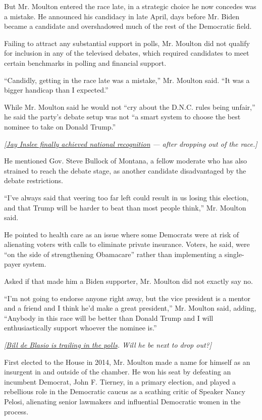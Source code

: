 But Mr. Moulton entered the race late, in a strategic choice he now
concedes was a mistake. He announced his candidacy in late April, days
before Mr. Biden became a candidate and overshadowed much of the rest of
the Democratic field.

Failing to attract any substantial support in polls, Mr. Moulton did not
qualify for inclusion in any of the televised debates, which required
candidates to meet certain benchmarks in polling and financial support.

``Candidly, getting in the race late was a mistake,'' Mr. Moulton said.
``It was a bigger handicap than I expected.''

While Mr. Moulton said he would not ``cry about the D.N.C. rules being
unfair,'' he said the party's debate setup was not ``a smart system to
choose the best nominee to take on Donald Trump.''

\emph{{[}}\href{https://www.nytimes3xbfgragh.onion/2019/08/23/us/politics/jay-inslee.html}{\emph{Jay
Inslee finally achieved national recognition}} \emph{--- after dropping
out of the race.{]}}

He mentioned Gov. Steve Bullock of Montana, a fellow moderate who has
also strained to reach the debate stage, as another candidate
disadvantaged by the debate restrictions.

``I've always said that veering too far left could result in us losing
this election, and that Trump will be harder to beat than most people
think,'' Mr. Moulton said.

He pointed to health care as an issue where some Democrats were at risk
of alienating voters with calls to eliminate private insurance. Voters,
he said, were ``on the side of strengthening Obamacare'' rather than
implementing a single-payer system.

Asked if that made him a Biden supporter, Mr. Moulton did not exactly
say no.

``I'm not going to endorse anyone right away, but the vice president is
a mentor and a friend and I think he'd make a great president,'' Mr.
Moulton said, adding, ``Anybody in this race will be better than Donald
Trump and I will enthusiastically support whoever the nominee is.''

\emph{{[}}\href{https://www.nytimes3xbfgragh.onion/2019/08/23/nyregion/de-blasio-town-hall-cnn.html}{\emph{Bill
de Blasio is trailing in the polls}}\emph{. Will he be next to drop
out?{]}}

First elected to the House in 2014, Mr. Moulton made a name for himself
as an insurgent in and outside of the chamber. He won his seat by
defeating an incumbent Democrat, John F. Tierney, in a primary election,
and played a rebellious role in the Democratic caucus as a scathing
critic of Speaker Nancy Pelosi, alienating senior lawmakers and
influential Democratic women in the process.

